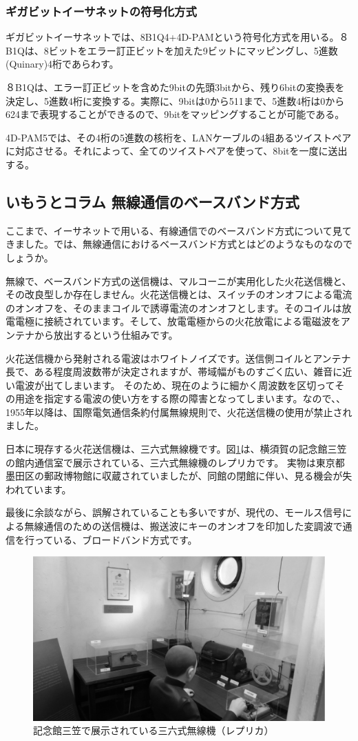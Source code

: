 \subsubsection{ギガビットイーサネットの符号化方式}
ギガビットイーサネットでは、8B1Q4+4D-PAMという符号化方式を用いる。８B1Qは、8ビットをエラー訂正ビットを加えた9ビットにマッピングし、5進数(Quinary)4桁であらわす。

８B1Qは、エラー訂正ビットを含めた9bitの先頭3bitから、残り6bitの変換表を決定し、5進数4桁に変換する。実際に、9bitは0から511まで、5進数4桁は0から624まで表現することができるので、9bitをマッピングすることが可能である。

4D-PAM5では、その4桁の5進数の核桁を、LANケーブルの4組あるツイストペアに対応させる。それによって、全てのツイストペアを使って、8bitを一度に送出する。

\subsection*{いもうとコラム 無線通信のベースバンド方式}
ここまで、イーサネットで用いる、有線通信でのベースバンド方式について見てきました。では、無線通信におけるベースバンド方式とはどのようなものなのでしょうか。

無線で、ベースバンド方式の送信機は、マルコーニが実用化した火花送信機と、その改良型しか存在しません。火花送信機とは、スイッチのオンオフによる電流のオンオフを、そのままコイルで誘導電流のオンオフとします。そのコイルは放電電極に接続されています。そして、放電電極からの火花放電による電磁波をアンテナから放出するという仕組みです。

火花送信機から発射される電波はホワイトノイズです。送信側コイルとアンテナ長で、ある程度周波数帯が決定されますが、帯域幅がものすごく広い、雑音に近い電波が出てしまいます。
そのため、現在のように細かく周波数を区切ってその用途を指定する電波の使い方をする際の障害となってしまいます。なので、、1955年以降は、国際電気通信条約付属無線規則で、火花送信機の使用が禁止されました。

日本に現存する火花送信機は、三六式無線機です。図\ref{fig:type36}は、横須賀の記念館三笠の館内通信室で展示されている、三六式無線機のレプリカです。
実物は東京都墨田区の郵政博物館に収蔵されていましたが、同館の閉館に伴い、見る機会が失われています。

最後に余談ながら、誤解されていることも多いですが、現代の、モールス信号による無線通信のための送信機は、搬送波にキーのオンオフを印加した変調波で通信を行っている、ブロードバンド方式です。

\begin{figure}[htbp]
	\includegraphics[width=12cm,clip]{draw/type36.eps}
	\caption{記念館三笠で展示されている三六式無線機（レプリカ）}
	\label{fig:type36}
\end{figure}

